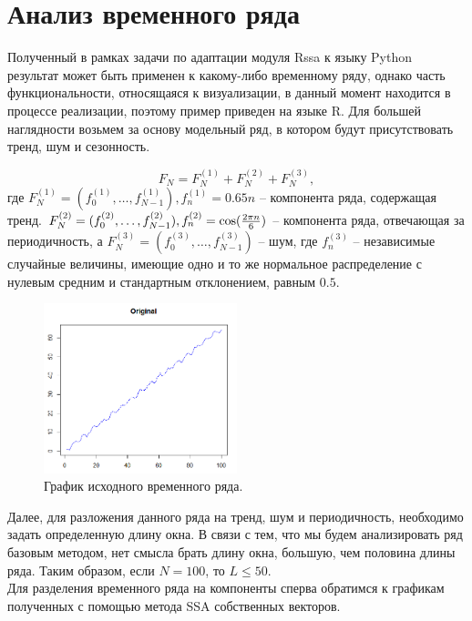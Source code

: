 \documentclass[specialist,
			   substylefile = spbu_report.rtx,
			   subf,href,colorlinks=true, 12pt]{disser}
\begin{document}
\chapter{Анализ временного ряда}

Полученный в рамках задачи по адаптации модуля Rssa к языку Python результат может быть применен к какому-либо временному ряду, однако часть функциональности, относящаяся к визуализации, в данный момент находится в процессе реализации, поэтому пример приведен на языке R. Для большей наглядности возьмем за основу модельный ряд, в котором будут присутствовать тренд, шум и сезонность. 

\begin{equation*}
	F_N = F_N^{(1)} + F_N^{(2)} + F_N^{(3)},
\end{equation*}
где $F_N^{(1)} = (f_0^{(1)}, \dots, f_{N-1}^{(1)}), f_n^{(1)} = 0.65 n$ – компонента ряда, содержащая тренд. $F_N^{(2)} = (f_0^{(2)}, \dots, f_{N-1}^{(2)}), f_n^{(2)} = \cos({2 \pi n \over 6})$ – компонента ряда, отвечающая за периодичность, а $F_N^{(3)} = (f_0^{(3)}, \dots, f_{N-1}^{(3)})$ – шум, где $f_n^{(3)}$ – независимые случайные величины, имеющие одно и то же нормальное распределение с нулевым средним и стандартным отклонением, равным $0.5$.

\begin{figure}[H]
	\centering
	\includegraphics[width=0.5\textwidth]{r_plot_ts_orig.png}
	\caption{График исходного временного ряда.}
	\label{fig:graph3}
\end{figure}

Далее, для разложения данного ряда на тренд, шум и периодичность, необходимо задать определенную длину окна. В связи с тем, что мы будем анализировать ряд базовым методом, нет смысла брать длину окна, большую, чем половина длины ряда. Таким образом, если $N = 100$, то $L \leq 50$.\\

Для разделения временного ряда на компоненты сперва обратимся к графикам полученных с помощью метода SSA собственных векторов.
\end{document}
